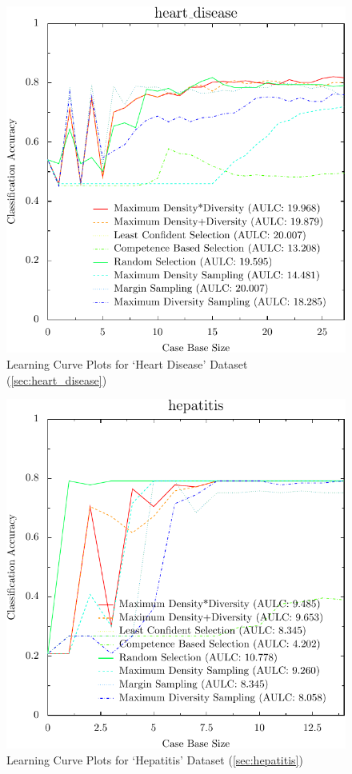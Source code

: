 \documentclass[a4paper,11pt]{report}
\begin{document}
\begin{figure}[h!]
\includegraphics{./Plots/heart_disease}
\caption{Learning Curve Plots for `Heart Disease' Dataset (\ref{sec:heart_disease})}
\end{figure}

\begin{figure}[h!]
\includegraphics{./Plots/hepatitis}
\caption{Learning Curve Plots for `Hepatitis' Dataset (\ref{sec:hepatitis})}
\end{figure}
\end{document}
